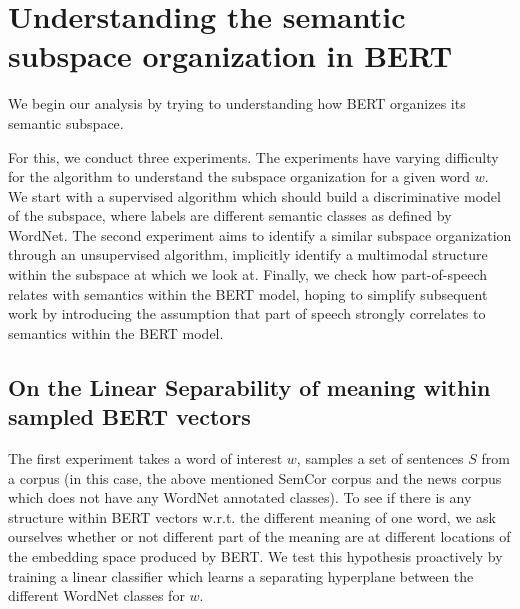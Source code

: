 \documentclass[a4paper,12pt,twoside,openright]{report}
\begin{document}

\chapter{Understanding the semantic subspace organization in BERT}\label{section:Understand_BERT}\label{section:UnderstandingBERT} 


We begin our analysis by trying to understanding how BERT organizes its semantic subspace.

For this, we conduct three experiments.
The experiments have varying difficulty for the algorithm to understand the subspace organization for a given word $w$.
We start with a supervised algorithm which should build a discriminative model of the subspace, where labels are different semantic classes as defined by WordNet.
The second experiment aims to identify a similar subspace organization through an unsupervised algorithm, implicitly identify a multimodal structure within the subspace at which we look at.
Finally, we check how part-of-speech relates with semantics within the BERT model, hoping to simplify subsequent work by introducing the assumption that part of speech strongly correlates to semantics within the BERT model.



\section{On the Linear Separability of meaning within sampled BERT vectors}

The first experiment takes a word of interest $w$, samples a set of sentences $S$ from a corpus (in this case, the above mentioned SemCor corpus and the news corpus \cite{news_corpus} which does not have any WordNet annotated classes).
To see if there is any structure within BERT vectors w.r.t. the different meaning of one word, we ask ourselves whether or not different part of the meaning are at different locations of the embedding space produced by BERT.
We test this hypothesis proactively by training a linear classifier which learns a separating hyperplane between the different WordNet classes for $w$.
\end{document}
